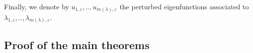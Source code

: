 \documentclass[11pt,reqno]{article}
\numberwithin{equation}{section}
\newcommand\e\varepsilon
\newcommand\la\lambda
\newcommand{\Ma}{\color{blue}}
\newcommand{\Lau}{\color{magenta}}
\newcommand{\Ying}{\color{red}}
\begin{document}
Finally, we denote by $u_{1,\e},..,u_{m(\la),\e}$ the  perturbed eigenfunctions associated to $\la_{1,\e},..,\la_{m(\la),\e}$.

	\subsection{\bf Proof of the main theorems}

	

    
\end{document}
